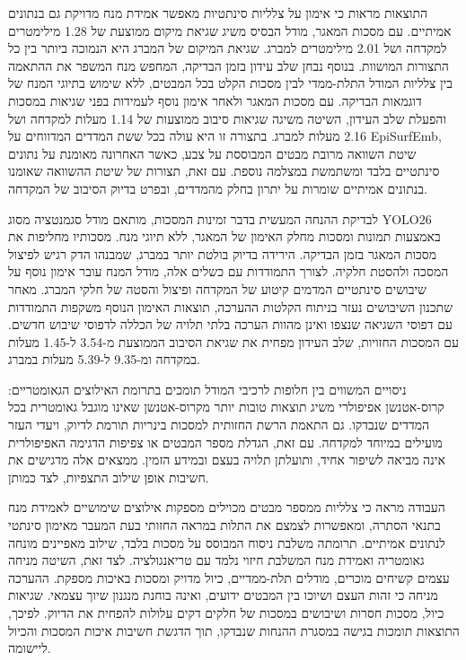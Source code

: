 {התוצאות מראות כי אימון על צלליות סינתטיות מאפשר אמידת מנח מדויקת גם בנתונים אמיתיים. עם מסכות המאגר, מודל הבסיס משיג שגיאת מיקום ממוצעת של \textenglish{1.28} מילימטרים למקדחה ושל \textenglish{2.01} מילימטרים למברג. שגיאת המיקום של המברג היא הנמוכה ביותר בין כל התצורות המושוות. בנוסף נבחן שלב עידון בזמן הבדיקה, המחפש מנח המשפר את ההתאמה בין צלליות המודל התלת-ממדי לבין מסכות הקלט בכל המבטים, ללא שימוש בתיוגי המנח של דוגמאות הבדיקה. עם מסכות המאגר ולאחר אימון נוסף לעמידות בפני שגיאות במסכות והפעלת שלב העידון, השיטה משיגה שגיאות סיבוב ממוצעות של \textenglish{1.14} מעלות למקדחה ושל \textenglish{2.16} מעלות למברג. בתצורה זו היא עולה בכל ששת המדדים המדווחים על \textenglish{EpiSurfEmb}, שיטת השוואה מרובת מבטים המבוססת על צבע, כאשר האחרונה מאומנת על נתונים סינתטיים בלבד ומשתמשת במצלמה נוספת. עם זאת, תצורות של שיטת ההשוואה שאומנו בנתונים אמיתיים שומרות על יתרון בחלק מהמדדים, ובפרט בדיוק הסיבוב של המקדחה.

לבדיקת ההנחה המעשית בדבר זמינות המסכות, מותאם מודל סגמנטציה מסוג \textenglish{YOLO26} באמצעות תמונות ומסכות מחלק האימון של המאגר, ללא תיוגי מנח. מסכותיו מחליפות את מסכות המאגר בזמן הבדיקה. הירידה בדיוק בולטת יותר במברג, שמבנהו הדק רגיש לפיצול המסכה ולהסטת חלקיה. לצורך התמודדות עם כשלים אלה, מודל המנח עובר אימון נוסף על שיבושים סינתטיים המדמים קיטוע של המקדחה ופיצול והסטה של חלקי המברג. מאחר שתכנון השיבושים נעזר בניתוח הקלטות ההערכה, תוצאות האימון הנוסף משקפות התמודדות עם דפוסי השגיאה שנצפו ואינן מהוות הערכה בלתי תלויה של הכללה לדפוסי שיבוש חדשים. עם המסכות החזויות, שלב העידון מפחית את שגיאת הסיבוב הממוצעת מ-\textenglish{3.54} ל-\textenglish{1.45} מעלות במקדחה ומ-\textenglish{9.35} ל-\textenglish{5.39} מעלות במברג.

ניסויים המשווים בין חלופות לרכיבי המודל תומכים בתרומת האילוצים הגאומטריים: קרוס-אטנשן אפיפולרי משיג תוצאות טובות יותר מקרוס-אטנשן שאינו מוגבל גאומטרית בכל המדדים שנבדקו. גם התאמת הרשת החזותית למסכות בינריות תורמת לדיוק, ויעדי העזר מועילים במיוחד למקדחה. עם זאת, הגדלת מספר המבטים או צפיפות הדגימה האפיפולרית אינה מביאה לשיפור אחיד, ותועלתן תלויה בעצם ובמידע הזמין. ממצאים אלה מדגישים את חשיבות אופן שילוב התצפיות, לצד כמותן.

העבודה מראה כי צלליות ממספר מבטים מכוילים מספקות אילוצים שימושיים לאמידת מנח בתנאי הסתרה, ומאפשרות לצמצם את התלות במראה החזותי בעת המעבר מאימון סינתטי לנתונים אמיתיים. תרומתה משלבת ניסוח המבוסס על מסכות בלבד, שילוב מאפיינים מונחה גאומטריה ואמידת מנח המשלבת חיזוי נלמד עם טריאנגולציה. לצד זאת, השיטה מניחה עצמים קשיחים מוכרים, מודלים תלת-ממדיים, כיול מדויק ומסכות באיכות מספקת. ההערכה מניחה כי זהות העצם ושיוכו בין המבטים ידועים, ואינה בוחנת מנגנון שיוך עצמאי. שגיאות כיול, מסכות חסרות ושיבושים במסכות של חלקים דקים עלולות להפחית את הדיוק. לפיכך, התוצאות תומכות בגישה במסגרת ההנחות שנבדקו, תוך הדגשת חשיבות איכות המסכות והכיול ליישומה.


} %
